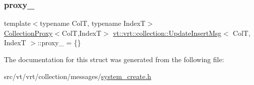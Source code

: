 \subsubsection{\texorpdfstring{proxy\+\_\+}{proxy\_}}
{\footnotesize\ttfamily template$<$typename ColT, typename IndexT$>$ \\
\hyperlink{structvt_1_1vrt_1_1collection_1_1_collection_proxy}{Collection\+Proxy}$<$ColT,IndexT$>$ \hyperlink{structvt_1_1vrt_1_1collection_1_1_update_insert_msg}{vt\+::vrt\+::collection\+::\+Update\+Insert\+Msg}$<$ ColT, IndexT $>$\+::proxy\+\_\+ = \{\}}



The documentation for this struct was generated from the following file\+:\begin{DoxyCompactItemize}
\item 
src/vt/vrt/collection/messages/\hyperlink{system__create_8h}{system\+\_\+create.\+h}\end{DoxyCompactItemize}
